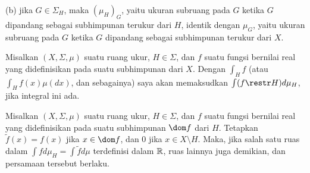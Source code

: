 (b) jika $G\in\Sigma_H$, maka $(\mu_H)_G$, yaitu ukuran subruang pada
$G$ ketika $G$ dipandang sebagai subhimpunan terukur dari $H$, identik
dengan $\mu_G$, yaitu ukuran subruang pada $G$ ketika $G$ dipandang
sebagai subhimpunan terukur dari $X$.

 Misalkan
$(X,\Sigma,\mu)$ suatu ruang ukur, $H\in\Sigma$, dan $f$ suatu fungsi
bernilai real yang didefinisikan pada suatu subhimpunan dari $X$. Dengan
$\int_H f$ (atau $\int_H f(x)\mu(dx)$, dan sebagainya) saya akan
memaksudkan $\int(f\restr H)d\mu_H$, jika integral ini ada.


 Misalkan $(X,\Sigma,\mu)$ suatu ruang ukur,
$H\in\Sigma$, dan $f$ suatu fungsi bernilai real yang didefinisikan
pada suatu subhimpunan $\dom f$ dari $H$. Tetapkan $\tilde f(x)=f(x)$
jika $x\in\dom f$, dan $0$ jika $x\in X\setminus H$. Maka, jika salah
satu ruas dalam $\int fd\mu_H=\int \tilde fd\mu$ terdefinisi dalam
$\Bbb R$, ruas lainnya juga demikian, dan persamaan tersebut berlaku.

